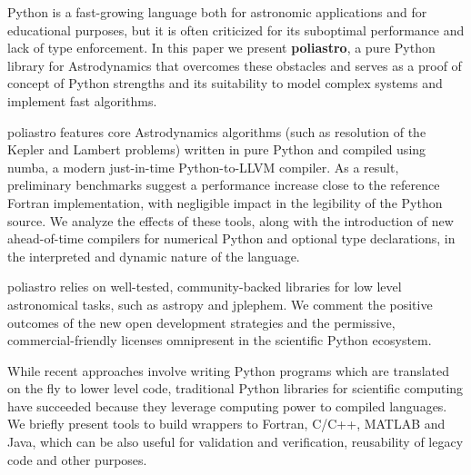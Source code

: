 Python is a fast-growing language both for astronomic applications\cite{2015arXiv150703989M} and for educational purposes, but it is often criticized for its suboptimal performance and lack of type enforcement. In this paper we present \textbf{poliastro}, a pure Python library for Astrodynamics that overcomes these obstacles and serves as a proof of concept of Python strengths and its suitability to model complex systems and implement fast algorithms.

poliastro features core Astrodynamics algorithms (such as resolution of the Kepler and Lambert problems) written in pure Python and compiled using numba, a modern just-in-time Python-to-LLVM compiler. As a result, preliminary benchmarks suggest a performance increase close to the reference Fortran implementation, with negligible impact in the legibility of the Python source. We analyze the effects of these tools, along with the introduction of new ahead-of-time compilers for numerical Python and optional type declarations, in the interpreted and dynamic nature of the language.

poliastro relies on well-tested, community-backed libraries for low level astronomical tasks, such as astropy\cite{Robitaille_2013} and jplephem. We comment the positive outcomes of the new open development strategies and the permissive, commercial-friendly licenses omnipresent in the scientific Python ecosystem.

While recent approaches involve writing Python programs which are translated on the fly to lower level code, traditional Python libraries for scientific computing have succeeded because they leverage computing power to compiled languages. We briefly present tools to build wrappers to Fortran, C/C++, MATLAB and Java, which can be also useful for validation and verification, reusability of legacy code and other purposes.